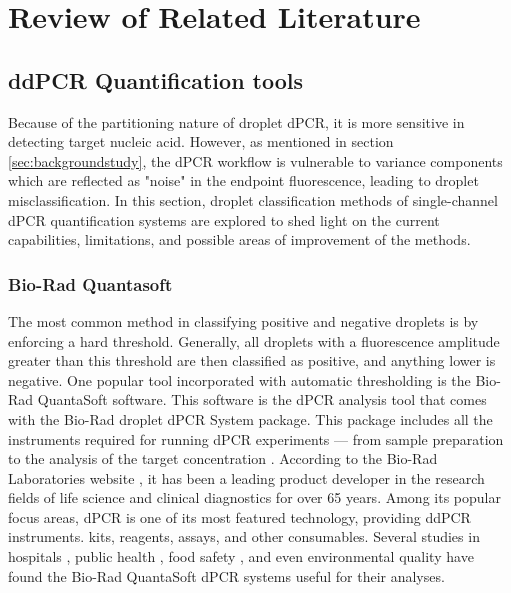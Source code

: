 \chapter{Review of Related Literature}
\label{sec:rrl} 

\section{ddPCR Quantification tools}
\label{sec:dpcrclassifiers}

Because of the partitioning nature of droplet dPCR, it is more sensitive in detecting target nucleic acid. However, as mentioned in section \ref{sec:backgroundstudy}, the dPCR workflow is vulnerable to variance components which are reflected as "noise" in the endpoint fluorescence, leading to droplet misclassification. In this section, droplet classification methods of single-channel dPCR quantification systems are explored to shed light on the current capabilities, limitations, and possible areas of improvement of the methods.

\subsection{Bio-Rad Quantasoft}
\label{sec:ddpcrsystem}
The most common method in classifying positive and negative droplets is by enforcing a hard threshold. Generally, all droplets with a fluorescence amplitude greater than this threshold are then classified as positive, and anything lower is negative. One popular tool incorporated with automatic thresholding is the Bio-Rad QuantaSoft software. This software is the dPCR analysis tool that comes with the Bio-Rad droplet dPCR System package. This package includes all the instruments required for running dPCR experiments --- from sample preparation to the analysis of the target concentration \cite{Bio-Rad2019}. According to the Bio-Rad Laboratories website \cite{bioradwebsite}, it has been a leading product developer in the research fields of life science and clinical diagnostics for over 65 years. Among its popular focus areas, dPCR is one of its most featured technology, providing ddPCR instruments. kits, reagents, assays, and other consumables. Several studies in hospitals \cite{Lopez2016,Chen2018,Abed2017,Tagliapietra2020}, public health \cite{Hussain2017,Nystrand2018}, food safety \cite{Chen2020,Capobianco2020,Basanisi2020}, and even environmental quality \cite{Hamaguchi2018,Jahne2020,Dobnik2016,Mauvisseau2019} have found the Bio-Rad QuantaSoft dPCR systems useful for their analyses. 

